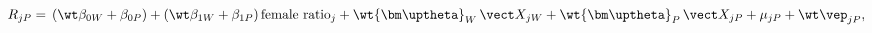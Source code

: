 \begin{equation}\label{equation7}
	R_{jP}=\,(\wt\beta_{0W}+\beta_{0P})+(\wt\beta_{1W}+\beta_{1P})\,\text{female ratio}_j+\wt{\bm\uptheta}_W\,\vect X_{jW}+\wt{\bm\uptheta}_P\,\vect X_{jP}+\mu_{jP}+\wt\vep_{jP},
\end{equation}